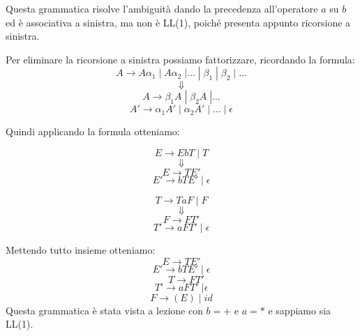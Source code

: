 \documentclass[11pt]{article}
\begin{document}
\noindent Questa grammatica risolve l'ambiguità dando la precedenza all'operatore $a$ su $b$ ed è 
associativa a sinistra, ma non è LL(1), poiché presenta appunto ricorsione a sinistra.

\noindent Per eliminare la ricorsione a sinistra possiamo fattorizzare, ricordando
la formula:
$$A \rightarrow A\alpha_1 \; | \; A\alpha_2\; | \dots \; | \; \beta_1 \; |\; \beta_2\;|\; \dots$$
$$\Downarrow$$
$$A \rightarrow \beta_1 A \; |\; \beta_2 A \; | \dots$$
$$A' \rightarrow \alpha_1 A' \; | \; \alpha_2 A' \; | \; \dots \; | \; \epsilon$$

\noindent Quindi applicando la formula otteniamo:
\begin{center}
  \begin{minipage}{0.4\linewidth}
  $$E \rightarrow EbT \;|\; T$$
  $$\Downarrow$$
  $$E \rightarrow TE'$$
  $$E' \rightarrow bTE' \;| \; \epsilon$$
  \end{minipage}
  \hspace{1cm}
  \begin{minipage}{0.4\linewidth}
  $$T \rightarrow TaF \;|\; F$$
  $$\Downarrow$$
  $$F \rightarrow FT'$$
  $$T' \rightarrow aFT' \;| \; \epsilon$$
  \end{minipage}
\end{center}
Mettendo tutto insieme otteniamo:
$$E \rightarrow TE'$$
$$E'\rightarrow bTE' \;|\; \epsilon$$
$$\quad T \rightarrow FT' $$$$ T'\rightarrow aFT'\;| \epsilon$$
$$
F \rightarrow (E) \; | \; id
$$
Questa grammatica è stata vista a lezione con $b = +$ e $a = *$ e sappiamo sia LL(1).
\end{document}

